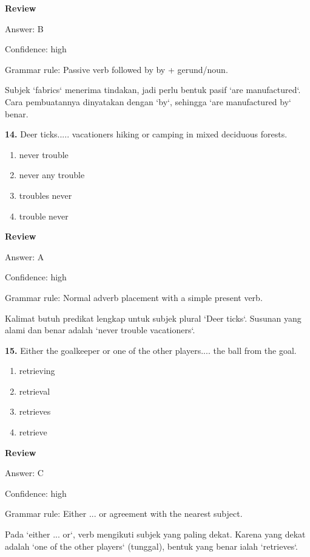 \documentclass[12pt]{article}
\begin{document}
\par
\begingroup
\setlength{\parskip}{0pt}
\setlength{\parindent}{0pt}
\textbf{Review}\par
Answer: B\par
Confidence: high\par
Grammar rule: Passive verb followed by by + gerund/noun.\par
Subjek `fabrics` menerima tindakan, jadi perlu bentuk pasif `are manufactured`. Cara pembuatannya dinyatakan dengan `by`, sehingga `are manufactured by` benar.\par
\endgroup
\par
\vspace{0.25\baselineskip}
\noindent\textbf{14.} Deer ticks..... vacationers hiking or camping in mixed deciduous forests.
\begin{enumerate}[label=(\Alph*),leftmargin=*,itemsep=0.2em]
\item never trouble
\item never any trouble
\item troubles never
\item trouble never
\end{enumerate}
\par
\begingroup
\setlength{\parskip}{0pt}
\setlength{\parindent}{0pt}
\textbf{Review}\par
Answer: A\par
Confidence: high\par
Grammar rule: Normal adverb placement with a simple present verb.\par
Kalimat butuh predikat lengkap untuk subjek plural `Deer ticks`. Susunan yang alami dan benar adalah `never trouble vacationers`.\par
\endgroup
\par
\vspace{0.25\baselineskip}
\noindent\textbf{15.} Either the goalkeeper or one of the other players.... the ball from the goal.
\begin{enumerate}[label=(\Alph*),leftmargin=*,itemsep=0.2em]
\item retrieving
\item retrieval
\item retrieves
\item retrieve
\end{enumerate}
\par
\begingroup
\setlength{\parskip}{0pt}
\setlength{\parindent}{0pt}
\textbf{Review}\par
Answer: C\par
Confidence: high\par
Grammar rule: Either ... or agreement with the nearest subject.\par
Pada `either ... or`, verb mengikuti subjek yang paling dekat. Karena yang dekat adalah `one of the other players` (tunggal), bentuk yang benar ialah `retrieves`.\par
\endgroup
\par
\vspace{0.25\baselineskip}
\end{document}
